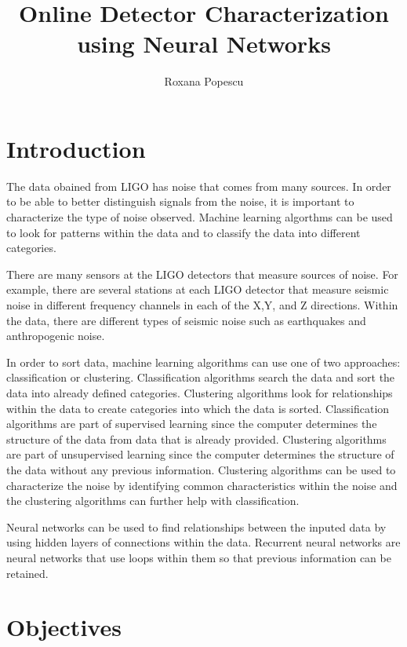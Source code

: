 \documentclass[colorlinks=true,pdfstartview=FitV,linkcolor=blue,
            citecolor=red,urlcolor=magenta]{ligodoc}
\title{Online Detector Characterization using Neural Networks}
\author{Roxana Popescu}
\begin{document}
\section{Introduction} 

\indent

\par The data obained from LIGO has noise that comes from many sources. In order to be able to better distinguish signals from the noise, it is important to characterize the type of noise observed. Machine learning algorthms can be used to look for patterns within the data and to classify the data into different categories.

\par There are many sensors at the LIGO detectors that measure sources of noise. For example, there are several stations at each LIGO detector that measure seismic noise in different frequency channels in each of the X,Y, and Z directions. Within the data, there are different types of seismic noise such as earthquakes and anthropogenic noise.  

\par In order to sort data, machine learning algorithms can use one of two approaches: classification or clustering. Classification algorithms search the data and sort the data into already defined categories. Clustering algorithms look for relationships within the data to create categories into which the data is sorted. Classification algorithms are part of supervised learning since the computer determines the structure of the data from data that is already provided. Clustering algorithms are part of unsupervised learning since the computer determines the structure of the data without any previous information. Clustering algorithms can be used to characterize the noise by identifying common characteristics within the noise and the clustering algorithms can further help with classification. \cite{Citation1}

\par Neural networks can be used to find relationships between the inputed data by using hidden layers of connections within the data. Recurrent neural networks are neural networks that use loops within them so that previous information can be retained. \cite{Citation1}

\section{Objectives}

\indent
\end{document}
